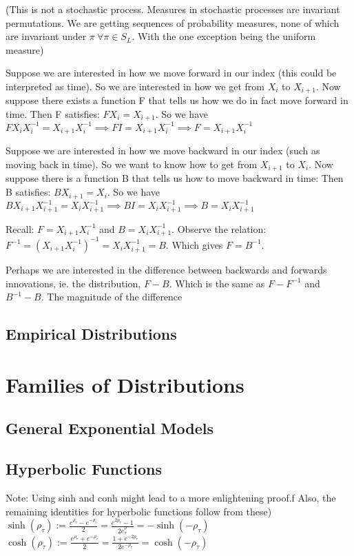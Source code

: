 \documentclass{article}
\theoremstyle{definition}
\begin{document}
(This is not a stochastic process. Measures in stochastic processes are invariant permutations. We are getting sequences of probability measures, none of which are invariant under $\pi \: \forall \pi \in S_L$. With the one exception being the uniform measure)

Suppose we are interested in how we move forward in our index (this could be interpreted as time). So we are interested in how we get from $X_i$ to $X_{i+1}$. Now suppose there exists a function F that tells us how we do in fact move forward in time.
Then F satisfies: $F X_i = X_{i+1} $. So we have $FX_i X_i^{-1} = X_{i+1}X_i^{-1} \implies FI = X_{i+1}X_i^{-1} \implies F = X_{i+1}X_i^{-1} $ 

Suppose we are interested in how we move backward in our index (such as moving back in time). So we want to know how to get from $X_{i+1}$ to $X_i$. Now suppose there is a function B that tells us how to move backward in time:
Then B satisfies: $BX_{i+1}= X_i$. So we have $BX_{i+1}X_{i+1}^{-1} = X_i X_{i+1}^{-1} \implies B I = X_i X_{i+1}^{-1} \implies  B = X_i X_{i+1}^{-1} $

Recall: $ F = X_{i+1}X_{i}^{-1}$ and $B = X_{i}X_{i+1}^{-1}$. Observe the relation: $F^{-1} = (X_{i+1}X_{i}^{-1})^{-1} = X_{i}X_{i+1}^{-1} = B$. Which gives $F = B^{-1}$.

Perhaps we are interested in the difference between backwards and forwards innovations, ie. the distribution, $F - B$. Which is the same as $F - F^{-1}$ and $B^{-1} - B$. The magnitude of the difference 


\subsection{Empirical Distributions}

\section{Families of Distributions}
\subsection{General Exponential Models}
\subsection{Hyperbolic Functions}
Note: Using sinh and conh might lead to a more enlightening proof.f
Also, the remaining identities for hyperbolic functions follow from these)
$\sinh(\rho_\tau) := \frac{e^{\rho_\tau} - e^{-\rho_\tau}}{2} = \frac{e^{2\rho_\tau} - 1}{2e^\rho_\tau} = -\sinh(-\rho_\tau)$
$\cosh(\rho_\tau) := \frac{e^{\rho_\tau} + e^{-\rho_\tau}}{2} = \frac{1+e^{-2\rho_\tau}}{2e^{-\rho_\tau}}= \cosh(-\rho_\tau)$
\end{document}
